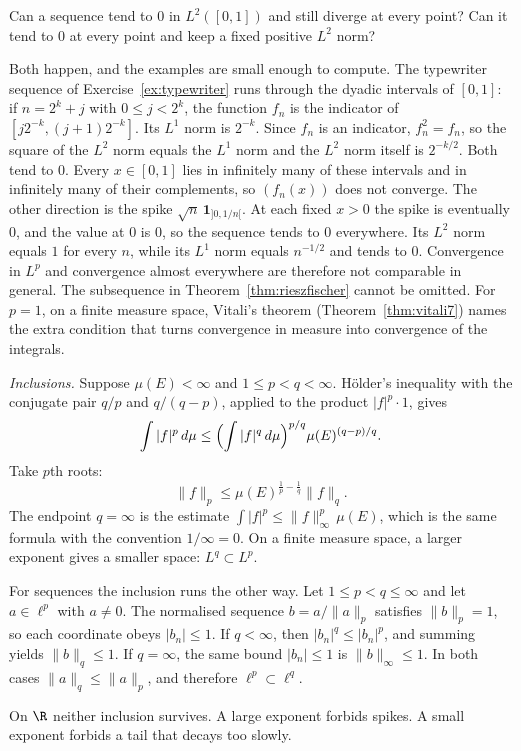 \begin{think}
Can a sequence tend to $0$ in $L^2([0,1])$ and still diverge at every point? Can it tend to $0$ at every point and keep a fixed positive $L^2$ norm?
\end{think}

Both happen, and the examples are small enough to compute. The typewriter sequence of Exercise~\ref{ex:typewriter} runs through the dyadic intervals of $[0,1]$: if $n=2^k+j$ with $0\le j<2^k$, the function $f_n$ is the indicator of $[j2^{-k},(j+1)2^{-k}]$. Its $L^1$ norm is $2^{-k}$. Since $f_n$ is an indicator, $f_n^2=f_n$, so the square of the $L^2$ norm equals the $L^1$ norm and the $L^2$ norm itself is $2^{-k/2}$. Both tend to $0$. Every $x\in[0,1]$ lies in infinitely many of these intervals and in infinitely many of their complements, so $(f_n(x))$ does not converge. The other direction is the spike $\sqrt n\,\mathbf 1_{]0,1/n[}$. At each fixed $x>0$ the spike is eventually $0$, and the value at $0$ is $0$, so the sequence tends to $0$ everywhere. Its $L^2$ norm equals $1$ for every $n$, while its $L^1$ norm equals $n^{-1/2}$ and tends to $0$. Convergence in $L^p$ and convergence almost everywhere are therefore not comparable in general. The subsequence in Theorem~\ref{thm:rieszfischer} cannot be omitted. For $p=1$, on a finite measure space, Vitali's theorem (Theorem~\ref{thm:vitali7}) names the extra condition that turns convergence in measure into convergence of the integrals.

\emph{Inclusions.} Suppose $\mu(E)<\infty$ and $1\le p<q<\infty$. Hölder's inequality with the conjugate pair $q/p$ and $q/(q-p)$, applied to the product $|f|^p\cdot 1$, gives
\[\int|f|^p\,d\mu\le\Bigl(\int|f|^q\,d\mu\Bigr)^{p/q}\mu(E)^{(q-p)/q}.\]
Take $p$th roots:
\[\|f\|_p\le\mu(E)^{\frac1p-\frac1q}\|f\|_q.\]
The endpoint $q=\infty$ is the estimate $\int|f|^p\le\|f\|_\infty^p\,\mu(E)$, which is the same formula with the convention $1/\infty=0$. On a finite measure space, a larger exponent gives a smaller space: $L^q\subset L^p$.

For sequences the inclusion runs the other way. Let $1\le p<q\le\infty$ and let $a\in\ell^p$ with $a\ne0$. The normalised sequence $b=a/\|a\|_p$ satisfies $\|b\|_p=1$, so each coordinate obeys $|b_n|\le1$. If $q<\infty$, then $|b_n|^q\le|b_n|^p$, and summing yields $\|b\|_q\le1$. If $q=\infty$, the same bound $|b_n|\le1$ is $\|b\|_\infty\le1$. In both cases $\|a\|_q\le\|a\|_p$, and therefore $\ell^p\subset\ell^q$.

On $\R$ neither inclusion survives. A large exponent forbids spikes. A small exponent forbids a tail that decays too slowly.

